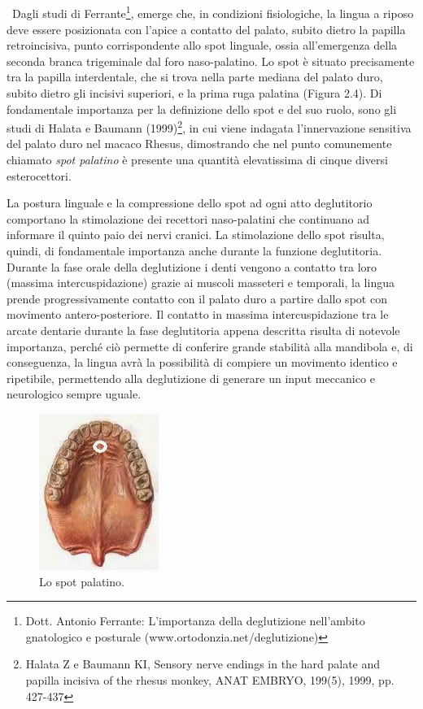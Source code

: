 \\\ \\\ \\\ \\\
Dagli studi di Ferrante\footnote{Dott. Antonio Ferrante: L'importanza della deglutizione nell'ambito gnatologico e posturale (www.ortodonzia.net/deglutizione)}, emerge che, in condizioni fisiologiche, la lingua a riposo deve essere posizionata con l'apice a contatto del palato, subito dietro la papilla retroincisiva, punto corrispondente allo spot linguale, ossia all'emergenza della seconda branca trigeminale dal foro naso-palatino.  Lo spot è situato precisamente tra la papilla interdentale, che si trova nella parte mediana del palato duro, subito dietro gli incisivi superiori, e la prima ruga palatina (Figura 2.4). Di fondamentale importanza per la definizione dello spot e del suo ruolo, sono gli studi di Halata e Baumann (1999)\footnote{Halata Z e Baumann KI, Sensory nerve endings in the hard palate and papilla incisiva of the rhesus monkey, ANAT
EMBRYO, 199(5), 1999, pp. 427-437}, in cui viene indagata l'innervazione sensitiva del palato duro nel macaco Rhesus, dimostrando che nel punto comunemente chiamato \emph{spot palatino} è presente una quantità elevatissima di cinque diversi esterocettori. 

La postura linguale e la compressione dello spot ad ogni atto deglutitorio comportano la stimolazione dei recettori naso-palatini che continuano ad informare il quinto paio dei nervi cranici. La stimolazione dello spot risulta, quindi, di fondamentale importanza anche durante la funzione deglutitoria. Durante la fase orale della deglutizione i denti vengono a contatto tra loro (massima intercuspidazione) grazie ai muscoli masseteri e temporali, la lingua prende progressivamente contatto con il palato duro a partire dallo spot con movimento antero-posteriore. Il contatto in massima intercuspidazione tra le arcate dentarie durante la fase deglutitoria appena descritta risulta di notevole importanza, perché ciò permette di conferire grande stabilità alla mandibola e, di conseguenza, la lingua avrà la possibilità di compiere un movimento identico e ripetibile, permettendo alla deglutizione di generare un input meccanico e neurologico sempre uguale.

 \begin{figure}[h!]
	\centering
	\includegraphics[scale=0.4]{source/immagini/spot_palatino.jpg}
	\caption[Lo spot palatino]{Lo spot palatino.}
	\label{fig:issuexample}
\end{figure}

